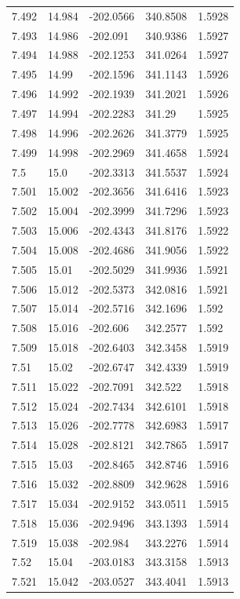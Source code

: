 \begin{tabular}{lllll}
7.492 & 14.984 & -202.0566 & 340.8508 & 1.5928 \\
7.493 & 14.986 & -202.091 & 340.9386 & 1.5927 \\
7.494 & 14.988 & -202.1253 & 341.0264 & 1.5927 \\
7.495 & 14.99 & -202.1596 & 341.1143 & 1.5926 \\
7.496 & 14.992 & -202.1939 & 341.2021 & 1.5926 \\
7.497 & 14.994 & -202.2283 & 341.29 & 1.5925 \\
7.498 & 14.996 & -202.2626 & 341.3779 & 1.5925 \\
7.499 & 14.998 & -202.2969 & 341.4658 & 1.5924 \\
7.5 & 15.0 & -202.3313 & 341.5537 & 1.5924 \\
7.501 & 15.002 & -202.3656 & 341.6416 & 1.5923 \\
7.502 & 15.004 & -202.3999 & 341.7296 & 1.5923 \\
7.503 & 15.006 & -202.4343 & 341.8176 & 1.5922 \\
7.504 & 15.008 & -202.4686 & 341.9056 & 1.5922 \\
7.505 & 15.01 & -202.5029 & 341.9936 & 1.5921 \\
7.506 & 15.012 & -202.5373 & 342.0816 & 1.5921 \\
7.507 & 15.014 & -202.5716 & 342.1696 & 1.592 \\
7.508 & 15.016 & -202.606 & 342.2577 & 1.592 \\
7.509 & 15.018 & -202.6403 & 342.3458 & 1.5919 \\
7.51 & 15.02 & -202.6747 & 342.4339 & 1.5919 \\
7.511 & 15.022 & -202.7091 & 342.522 & 1.5918 \\
7.512 & 15.024 & -202.7434 & 342.6101 & 1.5918 \\
7.513 & 15.026 & -202.7778 & 342.6983 & 1.5917 \\
7.514 & 15.028 & -202.8121 & 342.7865 & 1.5917 \\
7.515 & 15.03 & -202.8465 & 342.8746 & 1.5916 \\
7.516 & 15.032 & -202.8809 & 342.9628 & 1.5916 \\
7.517 & 15.034 & -202.9152 & 343.0511 & 1.5915 \\
7.518 & 15.036 & -202.9496 & 343.1393 & 1.5914 \\
7.519 & 15.038 & -202.984 & 343.2276 & 1.5914 \\
7.52 & 15.04 & -203.0183 & 343.3158 & 1.5913 \\
7.521 & 15.042 & -203.0527 & 343.4041 & 1.5913 \\

\end{tabular}
